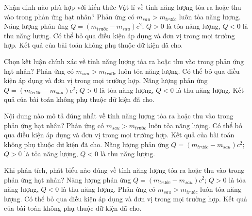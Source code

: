 \begin{ex}
Nhận định nào phù hợp với kiến thức Vật lí về tính năng lượng tỏa ra hoặc thu vào trong phản ứng hạt nhân?
\choice
{Phản ứng có $m_{sau}\gt m_{trước}$ luôn tỏa năng lượng.}
{\True Năng lượng phản ứng $Q=(m_{trước}-m_{sau})c^2$; $Q>0$ là tỏa năng lượng, $Q<0$ là thu năng lượng.}
{Có thể bỏ qua điều kiện áp dụng và đơn vị trong mọi trường hợp.}
{Kết quả của bài toán không phụ thuộc dữ kiện đã cho.}
\end{ex}

\begin{ex}
Chọn kết luận chính xác về tính năng lượng tỏa ra hoặc thu vào trong phản ứng hạt nhân?
\choice
{Phản ứng có $m_{sau}\gt m_{trước}$ luôn tỏa năng lượng.}
{Có thể bỏ qua điều kiện áp dụng và đơn vị trong mọi trường hợp.}
{\True Năng lượng phản ứng $Q=(m_{trước}-m_{sau})c^2$; $Q>0$ là tỏa năng lượng, $Q<0$ là thu năng lượng.}
{Kết quả của bài toán không phụ thuộc dữ kiện đã cho.}
\end{ex}

\begin{ex}
Nội dung nào mô tả đúng nhất về tính năng lượng tỏa ra hoặc thu vào trong phản ứng hạt nhân?
\choice
{Phản ứng có $m_{sau}\gt m_{trước}$ luôn tỏa năng lượng.}
{Có thể bỏ qua điều kiện áp dụng và đơn vị trong mọi trường hợp.}
{Kết quả của bài toán không phụ thuộc dữ kiện đã cho.}
{\True Năng lượng phản ứng $Q=(m_{trước}-m_{sau})c^2$; $Q>0$ là tỏa năng lượng, $Q<0$ là thu năng lượng.}
\end{ex}

\begin{ex}
Khi phân tích, phát biểu nào đúng về tính năng lượng tỏa ra hoặc thu vào trong phản ứng hạt nhân?
\choice
{\True Năng lượng phản ứng $Q=(m_{trước}-m_{sau})c^2$; $Q>0$ là tỏa năng lượng, $Q<0$ là thu năng lượng.}
{Phản ứng có $m_{sau}\gt m_{trước}$ luôn tỏa năng lượng.}
{Có thể bỏ qua điều kiện áp dụng và đơn vị trong mọi trường hợp.}
{Kết quả của bài toán không phụ thuộc dữ kiện đã cho.}
\end{ex}

